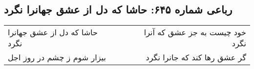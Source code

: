 \begin{center}
\section*{رباعی شماره ۶۴۵: حاشا که دل از عشق جهانرا نگرد}
\label{sec:0645}
\begin{longtable}{l p{0.5cm} r}
حاشا که دل از عشق جهانرا نگرد
&&
خود چیست به جز عشق که آنرا نگرد
\\
بیزار شوم ز چشم در روز اجل
&&
گر عشق رها کند که جانرا نگرد
\\
\end{longtable}
\end{center}
